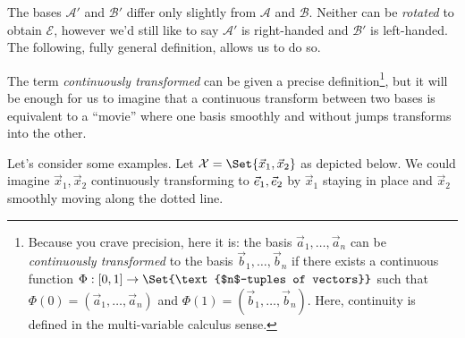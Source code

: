 The bases $\mathcal A'$ and $\mathcal B'$ differ only slightly from $\mathcal A$ and $\mathcal B$. Neither can
be \emph{rotated} to obtain $\mathcal E$, however we'd still like to say $\mathcal A'$ is right-handed and
$\mathcal B'$ is left-handed. The following, fully general definition, allows us to do so.


The term \emph{continuously transformed} can be given a precise definition\footnote{ Because you crave precision, here it is:
the basis $\vec a_1,\ldots, \vec a_n$ can be \emph{continuously transformed} to the basis $\vec b_1,\ldots,\vec b_n$ if there
exists a continuous function $\Phi:[0,1]\to\Set{\text{$n$-tuples of vectors}}$ such that $\Phi(0)=(\vec a_1,\ldots,\vec a_n)$
and $\Phi(1)=(\vec b_1,\ldots,\vec b_n)$. Here, continuity is defined in the multi-variable calculus sense.
}, but it will be enough for us
to imagine that  a continuous transform between two bases is equivalent to a ``movie'' where one
basis smoothly and without jumps transforms into the other.

Let's consider some examples. Let $\mathcal X=\Set{\vec x_1,\vec x_2}$ as depicted below. We could imagine $\vec x_1,\vec x_2$ continuously 
transforming to ${\vec e_1}, {\vec e_2}$ by $\vec x_1$ staying in place and $\vec x_2$ smoothly moving along the dotted
line.

